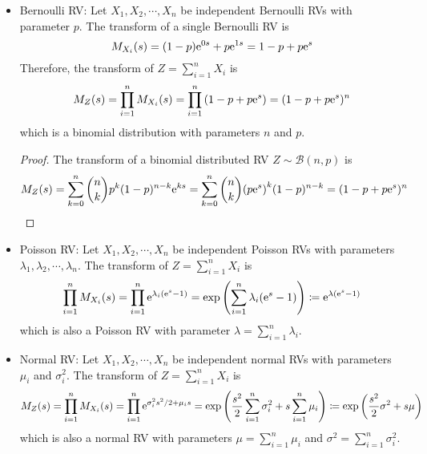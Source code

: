 \begin{example}
    \begin{itemize}
        \item Bernoulli RV: Let $X_1, X_2, \cdots, X_n$ be independent Bernoulli RVs with parameter $p$. The transform of a single Bernoulli RV is
        \begin{equation}
            M_{X_i}(s) = (1 - p)\mathrm{e}^{0s} + p\mathrm{e}^{1s} = 1 - p + p \mathrm{e}^{s}
        \end{equation}
        Therefore, the transform of $Z = \sum_{i=1}^{n} X_i$ is
        \begin{equation}
            M_{Z}(s) = \prod_{i=1}^{n} M_{X_i}(s) = \prod_{i=1}^{n} \qty(1 - p + p \mathrm{e}^{s}) = (1 - p + p \mathrm{e}^{s})^n
        \end{equation}
        which is a binomial distribution with parameters $n$ and $p$.
        \begin{proof}
            The transform of a binomial distributed RV $Z \sim \mathcal{B}(n, p)$ is
            \begin{equation}
                M_{Z}(s) = \sum_{k=0}^{n} \binom{n}{k} p^k (1 - p)^{n - k} \mathrm{e}^{ks} = \sum_{k=0}^{n} \binom{n}{k} \qty(p\mathrm{e}^s)^k (1 - p)^{n - k} = (1 - p + p \mathrm{e}^{s})^n
            \end{equation}
        \end{proof}
        \item Poisson RV: Let $X_1, X_2, \cdots, X_n$ be independent Poisson RVs with parameters $\lambda_1, \lambda_2, \cdots, \lambda_n$. The transform of $Z = \sum_{i=1}^{n} X_i$ is
        \begin{equation}
            \prod_{i=1}^{n} M_{X_i}(s) = \prod_{i=1}^{n} \mathrm{e}^{\lambda_i(\mathrm{e}^{s} - 1)} = \exp\qty(\sum_{i=1}^{n} \lambda_i(\mathrm{e}^{s} - 1)) \coloneqq \mathrm{e}^{\lambda (\mathrm{e}^{s} - 1)}
        \end{equation}
        which is also a Poisson RV with parameter $\lambda = \sum_{i=1}^{n} \lambda_i$.
        \item Normal RV: Let $X_1, X_2, \cdots, X_n$ be independent normal RVs with parameters $\mu_i$ and $\sigma_i^2$. The transform of $Z = \sum_{i=1}^{n} X_i$ is
        \begin{equation}
            M_{Z}(s) = \prod_{i=1}^{n} M_{X_i}(s) = \prod_{i=1}^{n} \mathrm{e}^{\sigma_i^2 s^2/2 + \mu_i s} = \exp \qty(\frac{s^2}{2} \sum_{i=1}^{n} \sigma_i^2 + s \sum_{i=1}^{n} \mu_i) \coloneqq \exp\qty(\frac{s^2}{2} \sigma^2 + s \mu)
        \end{equation}
        which is also a normal RV with parameters $\mu = \sum_{i=1}^{n} \mu_i$ and $\sigma^2 = \sum_{i=1}^{n} \sigma_i^2$.
    \end{itemize}
\end{example}


